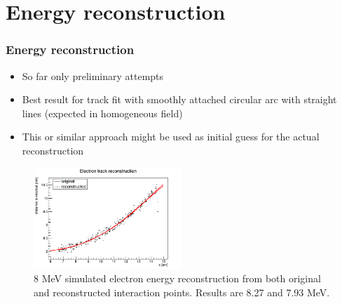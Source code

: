 \documentclass{beamer}
\begin{document}
	\section{Energy reconstruction}
	\begin{frame}
		\frametitle{Energy reconstruction}
		\begin{itemize}
			\item So far only preliminary attempts
			\item Best result for track fit with smoothly attached circular arc with straight lines (expected in homogeneous field)
			\item This or similar approach might be used as initial guess for the actual reconstruction
		\end{itemize}
		\begin{figure}
			\centering
			\includegraphics[width=0.5\textwidth]{../images/reco_e.png}
			\caption{8 MeV simulated electron energy reconstruction from both original and reconstructed interaction points. Results are 8.27 and 7.93 MeV.}
		\end{figure}		
	\end{frame}
	
	
\end{document}
